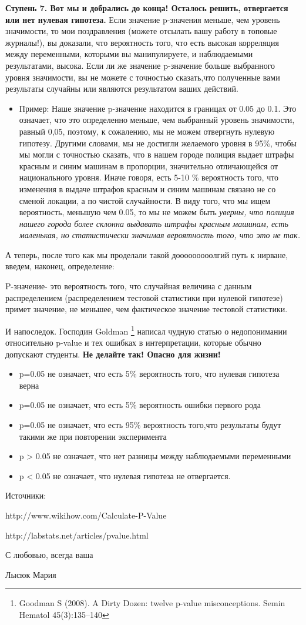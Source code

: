 \documentclass[a4paper,12pt]{article}
\begin{document}
  \textbf{Ступень 7. Вот мы и добрались до конца! Осталось решить, отвергается или нет нулевая гипотеза.} Если значение p-значения меньше, чем уровень значимости, то мои поздравления (можете отсылать вашу работу в топовые журналы!), вы доказали, что вероятность того, что есть высокая корреляция между переменными, которыми вы манипулируете, и наблюдаемыми результатами, высока. Если ли же значение p-значение больше выбранного уровня значимости, вы не можете с точностью сказать,что полученные вами результаты случайны или являются результатом ваших действий.

\begin{itemize}
  \item Пример: Наше значение p-значение находится в границах от 0.05 до 0.1. Это означает, что это определенно меньше, чем выбранный уровень значимости, равный 0,05, поэтому, к сожалению, мы не можем отвергнуть нулевую гипотезу. Другими словами, мы не достигли желаемого уровня в 95\%, чтобы мы могли с точностью сказать, что в нашем городе полиция выдает штрафы красным и синим машинам в пропорции, значительно отличающейся от национального уровня. Иначе говоря, есть 5-10 \% вероятность того, что изменения в выдаче штрафов красным и синим машинам связано не со сменой локации, а по чистой случайности. В виду того, что мы ищем вероятность, меньшую чем 0.05, то мы не можем быть \em{уверны}, что полиция нашего города более склонна выдавать штрафы красным машинам, есть маленькая, но статистически значимая вероятность того, что это не так.
      \end{itemize}

 А теперь, после того как мы проделали такой дооооооооолгий путь к нирване, введем, наконец, определение:

 P-значение- это вероятность того, что случайная величина с данным распределением (распределением тестовой статистики при нулевой гипотезе) примет значение, не меньшее, чем фактическое значение тестовой статистики.

 И напоследок. Господин Goldman \footnote {Goodman S (2008). A Dirty Dozen: twelve p-value misconceptions. Semin Hematol 45(3):135–140} написал чудную статью о недопонимании относительно p-value и тех ошибках в интерпретации, которые обычно допускают студенты. \textbf{Не делайте так! Опасно для жизни!}

 \begin{itemize}
   \item p=0.05 не означает, что есть 5\% вероятность того, что нулевая гипотеза верна
   \item p=0.05 не означает, что есть 5\% вероятность ошибки первого рода
   \item p=0.05 не означает, что есть 95\% вероятность того,что результаты будут такими же при повторении эксперимента
   \item p > 0.05 не означает, что нет разницы между наблюдаемыми переменными
   \item p < 0.05 не означает, что нулевая гипотеза не отвергается.
 \end{itemize}

Источники:

http://www.wikihow.com/Calculate-P-Value

http://labstats.net/articles/pvalue.html

\quad

 С любовью, всегда ваша

 Лысюк Мария
 \
\end{document}
